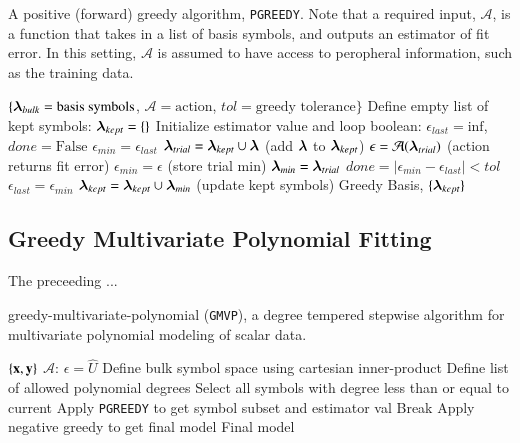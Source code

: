 \documentclass[twocolumn,aps,prd,floatfix,preprintnumbers,a4paper,nofootinbib,
superscriptaddress,10pt]{revtex4-1}
\def\gmvp#1{greedy-multivariate-polynomial#1
  (\texttt{GMVP}#1)\gdef\gmvp{\texttt{GMVP}}}
\begin{document}
{\scriptsize
\begin{algorithm}[H]
  \caption{A positive (forward) greedy algorithm, \texttt{PGREEDY}. Note that a required input, $\mathcal{A}$, is a function that takes in a list of basis symbols, and outputs an estimator of fit error. In this setting, $\mathcal{A}$ is assumed to have access to peropheral information, such as the training data.}
  \label{alg:pgreedy}
  \begin{algorithmic}[1]
     $ \{ {\bm{\lambda}}_{bulk} = \text{basis symbols}$, $\mathcal{A} = \text{action}$, $tol=\text{greedy tolerance}\}$
    \vskip 10pt
    \State Define empty list of kept symbols: ${\bm{\lambda}}_{kept} = \{\}$
    \State Initialize estimator value and loop boolean: $\epsilon_{last} = \mathrm{inf}$, $done = \text{False}$
      \State $\epsilon_{min} = \epsilon_{last}$
        \State ${\bm{\lambda}}_{trial} = {\bm{\lambda}}_{kept} \cup {\bm{\lambda}}$ {\hskip0.525in} (add ${\bm{\lambda}}$ to ${\bm{\lambda}}_{kept}$)
        \State $\epsilon = \mathcal{A}({\bm{\lambda}}_{trial})$ {\hskip0.70in} (action returns fit error)
          \State $\epsilon_{min} = \epsilon$  {\hskip0.825in} (store trial min)
          \State ${\bm{\lambda}}_{min} = {\bm{\lambda}}_{trial}$
        \EndIf
      \EndFor
      \State $done = |\epsilon_{min}-\epsilon_{last}|<tol$ %
        \State $\epsilon_{last} = \epsilon_{min}$
        \State ${\bm{\lambda}}_{kept} = {\bm{\lambda}}_{kept} \cup {\bm{\lambda}}_{min}$ {\hskip0.4in} (update kept symbols)
      \EndIf
    \EndWhile
    \vskip 10pt
     Greedy Basis, $\{ {\bm{\lambda}}_{kept} \}$
  \end{algorithmic}
\end{algorithm}
}

%
\subsection{Greedy Multivariate Polynomial Fitting}
%
The preceeding ...
\hspace{1cm}
{\scriptsize
\begin{algorithm}[H]
  \caption{\gmvp{}, a degree tempered stepwise algorithm for multivariate polynomial modeling of scalar data.}
  \label{alg:gmvp}
  \begin{algorithmic}[1]
     $ \{ \bf{x}, \bf{y} \}$
    \vskip 10pt
    \State {}
    \State $\mathcal{A}$: $\epsilon = \hat{U}$
    \State Define bulk symbol space using cartesian inner-product
    \State Define list of allowed polynomial degrees
      \State Select all symbols with degree less than or equal to current
      \State Apply \texttt{PGREEDY} to get symbol subset and estimator val
        \State Break
      \EndIf
    \EndFor
    \State Apply negative greedy to get final model
    \vskip 10pt
     Final model
  \end{algorithmic}
\end{algorithm}
}
\end{document}
